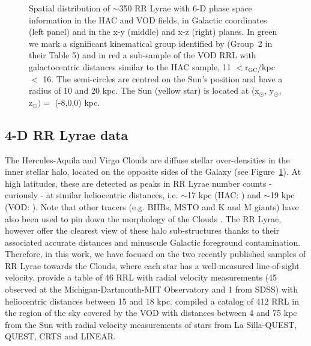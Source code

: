 \documentclass[fleqn,usenatbib]{mnras}
\begin{document}
\begin{figure}
	\vspace{-0.55cm}
    \caption{Spatial distribution of $\sim$350 RR Lyrae with 6-D phase
      space information in the HAC and VOD fields, in Galactic
      coordinates (left panel) and in the x-y (middle) and x-z (right)
      planes. In green we mark a significant kinematical group
      identified by \citet{Vivas2016} (Group~2 in their Table 5) and
      in red a sub-sample of the VOD RRL with galactocentric distances
      similar to the HAC sample, 11 $<\mathrm{r_{GC}}$/kpc$<$
      16. The semi-circles are centred on the Sun's position and have
      a radius of 10 and 20 kpc. The Sun (yellow star) is located at
      (x$_{\odot}$, y$_{\odot}$, z$_{\odot})= $ (-8,0,0) kpc.}
    \label{fig:lb}
\end{figure}
%
\subsection{4-D RR Lyrae data}
%
The Hercules-Aquila and Virgo Clouds are diffuse stellar
over-densities in the inner stellar halo, located on the opposite
sides of the Galaxy (see Figure~\ref{fig:lb}). At high latitudes,
these are detected as peaks in RR Lyrae number counts - curiously - at
similar heliocentric distances, i.e. $\sim$17 kpc (HAC:
\citealt{Wa09,Simion2014}) and $\sim$19 kpc (VOD: \citealt{Vivas2006,
  Duffau2014, Vivas2016}). Note that other tracers (e.g. BHBs, MSTO
and K and M giants) have also been used to pin down the morphology of
the Clouds \citep[see
  e.g.][]{Be07,Juric2008,Sharma2010,Bonaca2012,Conroy2018}. The RR
Lyrae, however offer the clearest view of these halo sub-structures
thanks to their associated accurate distances and minuscule Galactic
foreground contamination. Therefore, in this work, we have focused on
the two recently published samples of RR Lyrae towards the Clouds,
where each star has a well-measured line-of-sight
velocity. \citet{Simion2018} provide a table of 46 RRL with radial
velocity measurements (45 observed at the Michigan-Dartmouth-MIT
Observatory and 1 from SDSS) with heliocentric distances between 15
and 18 kpc. \cite{Vivas2016} compiled a catalog of 412 RRL in the
region of the sky covered by the VOD with distances between 4 and 75
kpc from the Sun with radial velocity measurements of stars from La
Silla-QUEST, QUEST, CRTS and LINEAR.

%
\end{document}

